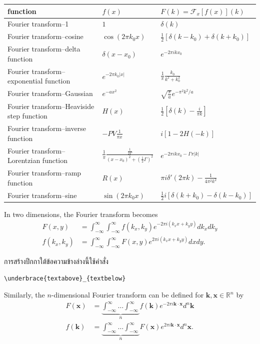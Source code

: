 \documentclass[a4paper,12pt]{article}
\begin{document}
\begin{tabular}{|l|l|l|}
\hline
function	& $f(x)$	& $F(k)=\mathcal{F}_x[f(x)](k)$ \\
\hline
Fourier transform--1
    & $1$
    & $\delta(k)$ \\
Fourier transform--cosine
    & $\cos(2\pi k_0x)$
    & $\frac{1}{2}[\delta(k-k_0)+\delta(k+k_0)]$ \\
Fourier transform--delta function
    & $\delta(x-x_0)$
    & $e^{-2\pi ikx_0}$ \\
Fourier transform--exponential function
    & $e^{-2\pi k_0|x|}$
    & $\frac{1}{\pi}\frac{k_0}{k^2+k_0^2}$ \\
Fourier transform--Gaussian
    & $e^{-ax^2}$
    & $\sqrt{\frac{\pi}{a}}e^{-\pi^2k^2/a}$ \\
Fourier transform--Heaviside step function
    & $H(x)$
    & $\frac{1}{2} \left[ \delta(k)-\frac{i}{\pi k} \right]$ \\
Fourier transform--inverse function
    & $-PV \frac{1}{\pi x}$
    & $i[1-2H(-k)]$ \\
Fourier transform--Lorentzian function
	& $\frac{1}{\pi}\frac{\frac{1}{2\Gamma}}{(x-x_0)^2+\left(\frac{1}{2}\Gamma \right)^2}$
	& $e^{-2\pi ikx_0-\Gamma \pi|k|}$ \\
Fourier transform--ramp function
	& $R(x)$
	& $\pi i \delta'(2\pi k) - \frac{1}{4\pi^2k^2}$ \\
Fourier transform--sine
	& $\sin(2\pi k_0x)$
	& $\frac{1}{2} i[\delta(k+k_0)-\delta(k-k_0)]$ \\
\hline
\end{tabular}
In two dimensions, the Fourier transform becomes
\begin{align}
F(x,y)	&=	\int_{-\infty}^\infty \int_{-\infty}^\infty f(k_x,k_y)e^{-2\pi i(k_x x + k_y y)} dk_x dk_y	\\
f(k_x,k_y)	&=	\int_{-\infty}^\infty \int_{-\infty}^\infty F(x,y)e^{2\pi i(k_x x + k_y y)} dx dy.	
\end{align}

การสร้างปีกกาใต้ข้อความข้างล่างนี้ใช้คำสั่ง
\begin{lstlisting}[numbers=none]
\underbrace{textabove}_{textbelow}
\end{lstlisting}

Similarly, the $n$-dimensional Fourier transform can be defined for $\mathbf{k}, \mathbf{x} \in \mathbb{R}^n$ by
\begin{align}
F(\mathbf{x})	&=	\underbrace{\int_{-\infty}^\infty \dots \int_{-\infty}^\infty}_n f(\mathbf{k})e^{-2\pi i \mathbf{k} \cdot \mathbf{x}}d^n \mathbf{k}	\\
f(\mathbf{k})	&=	\underbrace{\int_{-\infty}^\infty \dots \int_{-\infty}^\infty}_n F(\mathbf{x})e^{2\pi i \mathbf{k}\cdot \mathbf{x}}d^n \mathbf{x}.
\end{align}
\end{document}
